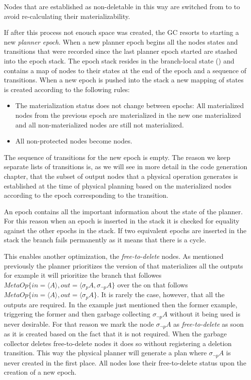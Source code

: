 Nodes that are established as non-deletable in this way are switched
from  to  to avoid re-calculating their
materializability.

If after this process not enouch space was created, the GC resorts to
starting a new \emph{planner epoch}. When a new planner epoch begins all
the nodes states and transitions that were recorded since the last
planner epoch started are stashed into the epoch stack. The epoch
stack resides in the branch-local state () and contains a map
of nodes to their states at the end of the epoch and a sequence of
transitions. When a new epoch is pushed into the stack a new mapping
of states is created according to the following rules:

\begin{itemize}
\item The materialization status does not change between epochs: All
materialized nodes from the previous epoch are materialized in the
new one materialized and all non-materialized nodes are still not
materialized.
\item All non-protected  nodes become  nodes.
\end{itemize}

The sequence of transitions for the new epoch is empty. The reason we
keep separate lists of transitions is, as we will see in more detail
in the code generation chapter, that the subset of output nodes that a
physical operation generates is established at the time of physical
planning based on the materialized nodes according to the epoch
corresponding to the transition.

An epoch contains all the important information about the state of the
planner. For this reason when an epoch is inserted in the stack it is
checked for equality against the other epochs in the stack. If two
equivalent epochs are inserted in the stack the branch fails
permanently as it means that there is a cycle.

This enables another optimization, the \emph{free-to-delete} nodes. As
mentioned previously the planner prioritizes the version of 
that materializes all the outputs for example it will prioritize the
branch that followes \(MetaOp\{in=\langle A \rangle, out=\langle
\sigma_p A, \sigma_{\neg p} A \}\) over the on that follows
\(MetaOp\{in=\langle A \rangle, out=\langle \sigma_p A \}\). It is
rarely the case, however, that all the outputs are required. In the
example just mentioned then the former example, triggering the former
 and then garbage collecting \(\sigma_{\neg p} A\) without it
being used is never desirable. For that reason we mark the node
\(\sigma_{\neg p} A\) as \emph{free-to-delete} as soon as it is created
based on the fact that it is not required. When the garbage collector
deletes free-to-delete nodes it does so without registering a deletion
transition. This way the physical planner will generate a plan where
\(\sigma_{\neg p} A\) is never created in the first place. All nodes
lose their free-to-delete status upon the creation of a new epoch.


